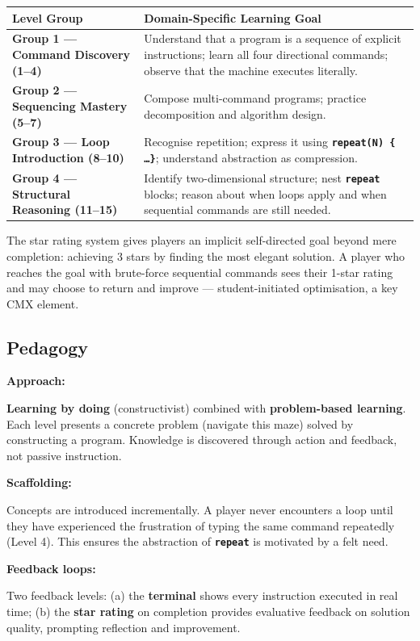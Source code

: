 \documentclass[12pt,a4paper]{article}
\newcommand{\keyword}[1]{\textcolor{keyword}{\texttt{\bfseries #1}}}
\newcommand{\gddfield}[2]{%
  \noindent\begin{minipage}[t]{3.5cm}\bfseries\color{accent}\sffamily#1\end{minipage}%
  \hspace{8pt}%
  \begin{minipage}[t]{\dimexpr\linewidth-3.5cm-8pt\relax}%
    #2
  \end{minipage}\par\smallskip}
\begin{document}
\vspace{4pt}

\begin{tcolorbox}[gddbox, title={Domain-Specific Goals per Level Group}]
\begin{tabularx}{\linewidth}{>{\bfseries\sffamily\color{primary}}p{4cm} X}
  \toprule
  Level Group & Domain-Specific Learning Goal \\
  \midrule
  Group 1 — Command Discovery (1--4) &
    Understand that a program is a sequence of explicit instructions; learn all four directional commands; observe that the machine executes literally. \\[4pt]
  Group 2 — Sequencing Mastery (5--7) &
    Compose multi-command programs; practice decomposition and algorithm design. \\[4pt]
  Group 3 — Loop Introduction (8--10) &
    Recognise repetition; express it using \keyword{repeat(N) \{ \ldots \}}; understand abstraction as compression. \\[4pt]
  Group 4 — Structural Reasoning (11--15) &
    Identify two-dimensional structure; nest \keyword{repeat} blocks; reason about when loops apply and when sequential commands are still needed. \\
  \bottomrule
\end{tabularx}
\end{tcolorbox}

\vspace{4pt}

\begin{tcolorbox}[gddbox, title={Student-Set Goals}]
The star rating system gives players an implicit self-directed goal beyond mere completion: achieving 3 stars by finding the most elegant solution. A player who reaches the goal with brute-force sequential commands sees their 1-star rating and may choose to return and improve --- student-initiated optimisation, a key CMX element.
\end{tcolorbox}

\vspace{6pt}

\subsection{Pedagogy}

\begin{tcolorbox}[gddbox, title={Learning Strategy}]
\gddfield{Approach:}{\textbf{Learning by doing} (constructivist) combined with \textbf{problem-based learning}. Each level presents a concrete problem (navigate this maze) solved by constructing a program. Knowledge is discovered through action and feedback, not passive instruction.}
\gddfield{Scaffolding:}{Concepts are introduced incrementally. A player never encounters a loop until they have experienced the frustration of typing the same command repeatedly (Level 4). This ensures the abstraction of \keyword{repeat} is motivated by a felt need.}
\gddfield{Feedback loops:}{Two feedback levels: (a) the \textbf{terminal} shows every instruction executed in real time; (b) the \textbf{star rating} on completion provides evaluative feedback on solution quality, prompting reflection and improvement.}
\end{tcolorbox}
\end{document}
